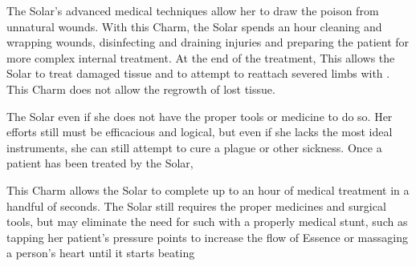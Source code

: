 
The Solar's advanced medical techniques allow her to draw the poison from
unnatural wounds. With this Charm, the Solar spends an hour cleaning and
wrapping wounds, disinfecting and draining injuries and preparing the patient
for more complex internal treatment. At the end of the treatment,  This allows the Solar to
treat damaged tissue and to attempt to reattach severed limbs with
. This Charm does not allow the
regrowth of lost tissue.



The Solar  even if she does not have the proper tools or medicine to do so.
Her efforts still must be efficacious and logical, but even if she lacks the
most ideal instruments, she can still attempt to cure a plague or other
sickness. Once a patient has been treated by the Solar, 



This Charm allows the Solar to complete up to an hour of medical treatment in a
handful of seconds.  The Solar still requires the proper
medicines and surgical tools, but may eliminate the need for such with a
properly medical stunt, such as tapping her patient's pressure points to
increase the flow of Essence or massaging a person's heart until it starts
beating



